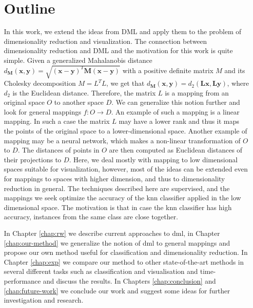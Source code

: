 \documentclass[12pt,a4paper]{report}
\begin{document}
\section{Outline}
In this work, we extend the ideas from DML and apply them to the problem of dimensionality reduction and visualization. The connection between dimensionality reduction and DML and the motivation for this work is quite simple. Given a generalized Mahalanobis distance $d_{\bm{M}}(\textbf{x},\textbf{y}) = \sqrt{(\textbf{x}-\textbf{y})^{T}\bm{M}(\textbf{x}-\textbf{y})}$ with a positive definite matrix $M$ and its Cholesky decomposition $M=L^TL$, we get that $d_{\bm{M}}(\textbf{x},\textbf{y}) = d_{2}(\bm{L}\textbf{x},\bm{L}\textbf{y})$, where $d_2$ is the Euclidean distance. Therefore, the matrix $L$ is a mapping from an original space $O$ to another space $D$. We can generalize this notion further and look for general mappings $f: O \to D$. An example of such a mapping is a linear mapping. In such a case the matrix $L$ may have a lower rank and thus it maps the points of the original space to a lower-dimensional space. Another example of mapping may be a neural network, which makes a non-linear transformation of $O$ to $D$. The distances of points in $O$ are then computed as Euclidean distances of their projections to $D$. Here, we deal mostly with mapping to low dimensional spaces suitable for visualization, however, most of the ideas can be extended even for mappings to spaces with higher dimension, and thus to dimensionality reduction in general. The techniques described here are supervised, and the mappings we seek optimize the accuracy of the \ac{knn} classifier applied in the low dimensional space. The motivation is that in case the \ac{knn} classifier has high accuracy, instances from the same class are close together.

In Chapter \ref{chap:rw} we describe current approaches to \acl{dml}, in Chapter \ref{chap:our-method} we generalize the notion of \ac{dml} to general mappings and propose our own method useful for classification and dimensionality reduction. In Chapter \ref{chap:exp} we compare our method to other state-of-the-art methods in several different tasks such as classification and visualisation and time-performance and discuss the results. In Chapters \ref{chap:conclusion} and \ref{chap:future-work} we conclude our work and suggest some ideas for further investigation and research.

\end{document}
